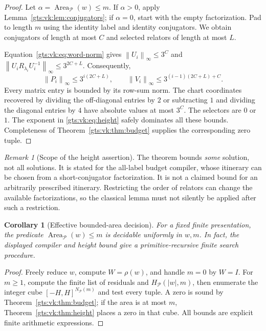 \documentclass[11pt,letterpaper]{article}
\newtheorem{corollary}[theorem]{Corollary}
\theoremstyle{definition}
\theoremstyle{remark}
\newtheorem{remark}[theorem]{Remark}
\newcommand{\Pp}{\mathcal P}
\newcommand{\Area}{\operatorname{Area}}
\newcommand{\norm}[1]{\left\lVert #1\right\rVert}
\begin{document}
\begin{proof}
Let $\alpha=\Area_{\Pp}(w)\leq m$. If $\alpha>0$, apply Lemma~\ref{gts:vk:lem:conjugators}; if $\alpha=0$, start with the empty factorization. Pad to length $m$ using the identity label and identity conjugators. We obtain conjugators of length at most $C$ and selected relators of length at most $L$.

Equation~\eqref{gts:vk:eq:word-norm} gives $\norm{U_i}_\infty\leq3^C$ and
$\norm{U_iR_{\lambda_i}U_i^{-1}}_\infty\leq3^{2C+L}$.
Consequently,
\[
 \norm{P_i}_\infty\leq3^{i(2C+L)},\qquad
 \norm{V_i}_\infty\leq3^{(i-1)(2C+L)+C}.
\]
Every matrix entry is bounded by its row-sum norm. The chart coordinates recovered by dividing the off-diagonal entries by $2$ or subtracting $1$ and dividing the diagonal entries by $4$ have absolute values at most $3^C$. The selectors are $0$ or $1$. The exponent in \eqref{gts:vk:eq:height} safely dominates all these bounds. Completeness of Theorem~\ref{gts:vk:thm:budget} supplies the corresponding zero tuple.
\end{proof}

\begin{remark}[Scope of the height assertion]
The theorem bounds \emph{some} solution, not all solutions. It is stated for the all-label budget compiler, whose itinerary can be chosen from a short-conjugator factorization. It is not a claimed bound for an arbitrarily prescribed itinerary. Restricting the order of relators can change the available factorizations, so the classical lemma must not silently be applied after such a restriction.
\end{remark}

\begin{corollary}[Effective bounded-area decision]\label{gts:vk:cor:slice}
For a fixed finite presentation, the predicate
$\Area_{\Pp}(w)\leq m$ is decidable uniformly in $w,m$. In fact, the displayed compiler and height bound give a primitive-recursive finite search procedure.
\end{corollary}

\begin{proof}
Freely reduce $w$, compute $W=\rho(w)$, and handle $m=0$ by $W=I$. For $m\geq1$, compute the finite list of residuals and $H_{\Pp}(|w|,m)$, then enumerate the integer cube
$[-H,H]^{N_{\Pp}(m)}$ and test every tuple. A zero is sound by Theorem~\ref{gts:vk:thm:budget}; if the area is at most $m$, Theorem~\ref{gts:vk:thm:height} places a zero in that cube. All bounds are explicit finite arithmetic expressions.
\end{proof}
\end{document}
